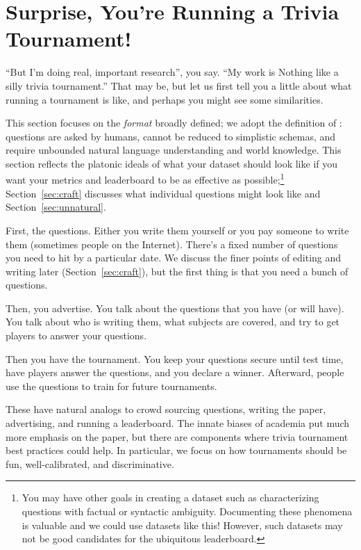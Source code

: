 

\section{Surprise, You're Running a Trivia Tournament!}
\label{sec:tournament}


``But I'm doing real, important research'', you say.  
``My work is Nothing like a silly trivia tournament.''  
That may be, but let us first tell you a little about what running a tournament is like, and perhaps you might see some similarities.

This section focuses on the  \emph{format} broadly defined; we adopt the definition of :
questions are asked by humans,
cannot be reduced to simplistic schemas,
and require unbounded natural language understanding and world knowledge. 
This section reflects the platonic ideals of what your dataset should look like if you want your metrics and leaderboard to be as effective as possible;\footnote{You may have other goals in creating a  dataset such as characterizing questions with factual or syntactic ambiguity.  Documenting these phenomena is valuable and we could use datasets like this!  However, such datasets may not be good candidates for the ubiquitous leaderboard.} Section~\ref{sec:craft} discusses what individual questions might look like and Section~\ref{sec:unnatural}.

First, the questions.
Either you write them yourself or you pay someone to write them (sometimes people on the Internet). 
There's a fixed number of questions you need to hit by a particular date. 
We discuss the finer points of editing and writing later (Section~\ref{sec:craft}), but the first thing is that you need a bunch of questions.

Then, you advertise.  
You talk about the questions that you have (or will have).  
You talk about who is writing them, what subjects are covered, and try to get players to answer your questions.

Then you have the tournament. 
You keep your questions secure until test time, have players answer the questions, and you declare a winner. 
Afterward, people use the questions to train for future tournaments.

These have natural analogs to crowd sourcing questions, writing the paper, advertising, and running a leaderboard. 
The innate biases of academia put much more emphasis on the paper, but there are components where trivia tournament best practices could help. 
In particular, we focus on how tournaments should be fun, well-calibrated, and discriminative.

